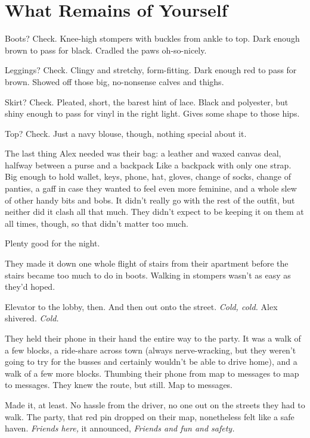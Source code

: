 \hypertarget{what-remains-of-yourself}{%
\chapter{What Remains of Yourself}\label{what-remains-of-yourself}}

Boots? Check. Knee-high stompers with buckles from ankle to top. Dark enough brown to pass for black. Cradled the paws oh-so-nicely.

Leggings? Check. Clingy and stretchy, form-fitting. Dark enough red to pass for brown. Showed off those big, no-nonsense calves and thighs.

Skirt? Check. Pleated, short, the barest hint of lace. Black and polyester, but shiny enough to pass for vinyl in the right light. Gives some shape to those hips.

Top? Check. Just a navy blouse, though, nothing special about it.

The last thing Alex needed was their bag: a leather and waxed canvas deal, halfway between a purse and a backpack Like a backpack with only one strap. Big enough to hold wallet, keys, phone, hat, gloves, change of socks, change of panties, a gaff in case they wanted to feel even more feminine, and a whole slew of other handy bits and bobs. It didn't really go with the rest of the outfit, but neither did it clash all that much. They didn't expect to be keeping it on them at all times, though, so that didn't matter too much.

Plenty good for the night.

They made it down one whole flight of stairs from their apartment before the stairs became too much to do in boots. Walking in stompers wasn't as easy as they'd hoped.

Elevator to the lobby, then. And then out onto the street. \emph{Cold, cold.} Alex shivered. \emph{Cold.}

They held their phone in their hand the entire way to the party. It was a walk of a few blocks, a ride-share across town (always nerve-wracking, but they weren't going to try for the busses and certainly wouldn't be able to drive home), and a walk of a few more blocks. Thumbing their phone from map to messages to map to messages. They knew the route, but still. Map to messages.

Made it, at least. No hassle from the driver, no one out on the streets they had to walk. The party, that red pin dropped on their map, nonetheless felt like a safe haven. \emph{Friends here,} it announced, \emph{Friends and fun and safety.}

